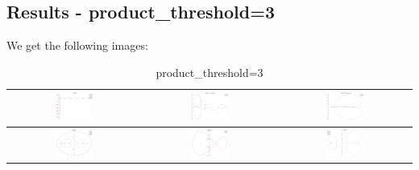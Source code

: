 \documentclass[a4paper,10pt]{article}
\begin{document}
 \subsection{Results - product\_threshold=3}
 We get the following images:
 \begin{table}[!ht]
 \caption{product\_threshold=3}
 \begin{tabular}{|c|c|c|}
  \hline
  \includegraphics[width=0.3\textwidth]{PT_3_z1.png} &
  \includegraphics[width=0.3\textwidth]{PT_3_C1z1.png} &
  \includegraphics[width=0.3\textwidth]{PT_3_C2z1.png} \\ \hline
  \includegraphics[width=0.3\textwidth]{PT_3_z2.png} &
  \includegraphics[width=0.3\textwidth]{PT_3_zed_C0.png} &
  \includegraphics[width=0.3\textwidth]{PT_3_zed.png} \\ \hline
 \end{tabular}
 \end{table}
\end{document}
